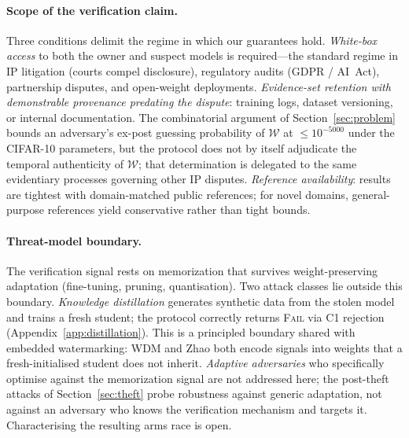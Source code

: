 \documentclass{article}
\begin{document}
\paragraph{Scope of the verification claim.}
Three conditions delimit the regime in which our guarantees hold.
\emph{White-box access} to both the owner and suspect models is
required---the standard regime in IP litigation (courts compel
disclosure), regulatory audits (GDPR / AI~Act), partnership
disputes, and open-weight deployments.
\emph{Evidence-set retention with demonstrable provenance
predating the dispute}: training logs, dataset versioning, or
internal documentation. The combinatorial argument of
Section~\ref{sec:problem} bounds an adversary's ex-post guessing
probability of $\mathcal{W}$ at $\le 10^{-5000}$ under the
CIFAR-10 parameters, but the protocol does not by itself
adjudicate the temporal authenticity of $\mathcal{W}$; that
determination is delegated to the same evidentiary processes
governing other IP disputes.
\emph{Reference availability}: results are tightest with
domain-matched public references; for novel domains, general-purpose
references yield conservative rather than tight bounds.

\paragraph{Threat-model boundary.}
The verification signal rests on memorization that survives
weight-preserving adaptation (fine-tuning, pruning, quantisation).
Two attack classes lie outside this boundary. \emph{Knowledge
distillation} generates synthetic data from the stolen model and
trains a fresh student; the protocol correctly returns
\textsc{Fail} via C1 rejection
(Appendix~\ref{app:distillation}). This is a principled boundary
shared with embedded watermarking: WDM and Zhao both encode signals
into weights that a fresh-initialised student does not inherit.
\emph{Adaptive adversaries} who specifically optimise against the
memorization signal are not addressed here; the post-theft attacks
of Section~\ref{sec:theft} probe robustness against generic
adaptation, not against an adversary who knows the verification
mechanism and targets it. Characterising the resulting arms race
is open.
\end{document}
